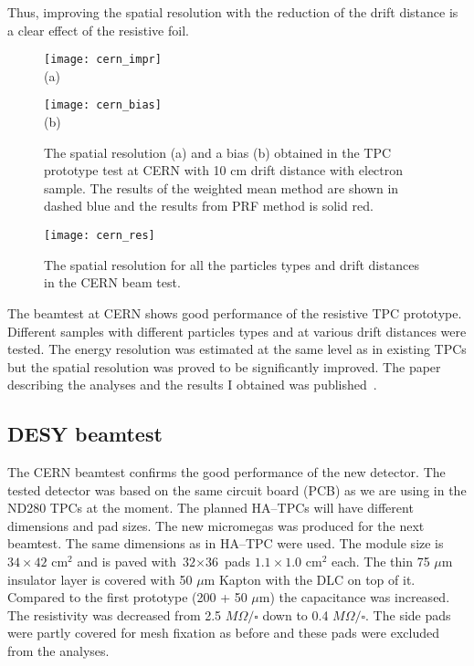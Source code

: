 \documentclass[../main.tex]{subfiles}
\begin{document}
Thus, improving the spatial resolution with the reduction of the drift distance is a clear effect of the resistive foil.

\begin{figure}[!ht]
  \centering
  \begin{minipage}{0.49\linewidth}
    \centering
    \texttt{[image: cern\_impr]} \\ (a)
  \end{minipage}
  \begin{minipage}{0.49\linewidth}
    \centering
    \texttt{[image: cern\_bias]} \\ (b)
  \end{minipage}
  \caption{The spatial resolution (a) and a bias (b) obtained in the TPC prototype test at CERN with 10 cm drift distance with electron sample. The results of the weighted mean method are shown in dashed blue and the results from PRF method is solid red.}
  \label{fig:tpc:cern_sr}
\end{figure}

\begin{figure}[!ht]
  \centering
  \texttt{[image: cern\_res]}
  \caption{The spatial resolution for all the particles types and drift distances in the CERN beam test.}
  \label{fig:tpc:sr_tot}
\end{figure}

The beamtest at CERN shows good performance of the resistive TPC prototype. Different samples with different particles types and at various drift distances were tested. The energy resolution was estimated at the same level as in existing TPCs but the spatial resolution was proved to be significantly improved. The paper describing the analyses and the results I obtained was published~\cite{Attie2019b}.

\subsection{DESY beamtest}
The CERN beamtest confirms the good performance of the new detector. The tested detector was based on the same circuit board (PCB) as we are using in the ND280 TPCs at the moment. The planned HA--TPCs will have different dimensions and pad sizes. The new micromegas was produced for the next beamtest. The same dimensions as in HA--TPC were used. The module size is $\text{34}\times\text{42}\text{ cm}^2$ and is paved with $\text{32}\times\text{36}$ pads $\text{1.1}\times\text{1.0}\text{ cm}^2$ each. The thin 75 $\mu\text{m}$ insulator layer is covered with 50 $\mu\text{m}$ Kapton with the DLC on top of it. Compared to the first prototype (200 + 50 $\mu\text{m}$) the capacitance was increased. The resistivity was decreased from 2.5 $M\Omega/\square$ down to 0.4 $M\Omega/\square$. The side pads were partly covered for mesh fixation as before and these pads were excluded from the analyses.
\end{document}
